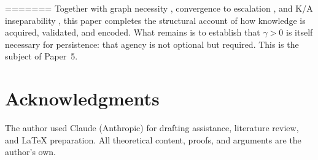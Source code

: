 \documentclass[11pt]{article}
\theoremstyle{definition}
\begin{document}
=======
Together with graph necessity \cite{McCarthy2026a}, convergence to
escalation \cite{McCarthy2026b}, and K/A inseparability \cite{McCarthy2026c},
this paper completes the structural account of
how knowledge is acquired, validated, and encoded. What remains is to
establish that $\gamma > 0$ is itself necessary for persistence: that
agency is not optional but required. This is the subject of Paper~5.

\section*{Acknowledgments}

The author used Claude (Anthropic) for drafting assistance, literature review, and \LaTeX{} preparation. All theoretical content, proofs, and arguments are the author's own.
\end{document}
